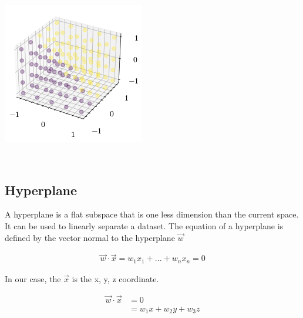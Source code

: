 \documentclass[openany]{book}
\begin{document}
    \begin{center}
    \includegraphics[width=\textwidth]{combined_files/combined_101_1.png}
    \end{center}
    { \hspace*{\fill} \\}
    
    \subsection{Hyperplane}\label{hyperplane}

A hyperplane is a flat subspace that is one less dimension than the
current space. It can be used to linearly separate a dataset. The
equation of a hyperplane is defined by the vector normal to the
hyperplane \(\vec{w}\)

\begin{align*}
\vec{w} \cdot \vec{x} = w_1 x_1 + ... + w_n x_n = 0
\end{align*}

In our case, the \(\vec{x}\) is the x, y, z coordinate.

\begin{align*}
\vec{w} \cdot \vec{x} &= 0 \\
&= w_1 x + w_2 y + w_3 z
\end{align*}
\end{document}
